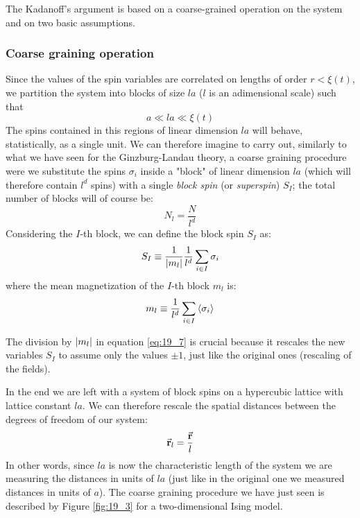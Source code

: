 \documentclass[../../Main/Main.tex]{subfiles}
\begin{document}
The Kadanoff's argument is based on a coarse-grained operation on the system and on two basic assumptions.

\subsubsection{Coarse graining operation}
Since the values of the spin variables are correlated on lengths of order \( r < \xi (t) \), we partition the system into blocks of size \( la \) (\( l \) is an adimensional scale) such that
\begin{equation*}
a \ll l a \ll \xi (t)
\end{equation*}
The spins contained in this regions of linear dimension \( la \) will behave, statistically, as a single unit.
We can therefore imagine to carry out, similarly to what we have seen for the Ginzburg-Landau theory, a coarse graining procedure were we substitute the spins \( \sigma _i \)  inside a "block" of linear dimension \( la \)  (which will therefore contain \( l^d \)  spins) with a single \emph{block spin} (or \emph{superspin}) \( S_I \); the total number of blocks will of course be:
\begin{equation*}
  N_l = \frac{N}{l^d}
\end{equation*}
 Considering the \( I \)-th block, we can define the block spin \( S_I \) as:
\begin{equation}
  S_I \equiv \frac{1}{\abs{m_l} } \frac{1}{l^d} \sum_{i \in I}^{}  \sigma _i
  \label{eq:19_7}
\end{equation}
where the mean magnetization of the \( I \)-th block \( m_l \) is:
\begin{equation}
  m_l \equiv \frac{1}{l^d} \sum_{i \in I}^{} \expval{ \sigma _i }
\end{equation}

\begin{remark}
The division by \( \abs{m_l}  \) in equation \eqref{eq:19_7} is crucial because it rescales the new variables \( S_I \) to assume only the values \( \pm 1 \), just like the original ones (rescaling of the fields).
\end{remark}

In the end we are left with a system of block spins on a hypercubic lattice with lattice constant \( la \). We can therefore rescale the spatial distances between the degrees of freedom of our system:
\begin{equation*}
  \va{r}_l = \frac{\va{r}}{l}
\end{equation*}
In other words, since \( la \) is now the characteristic length of the system we are measuring the distances in units of \( la \)  (just like in the original one we measured distances in units of \( a \)). The coarse graining procedure we have just seen is described by Figure \ref{fig:19_3} for a two-dimensional Ising model.
\end{document}
